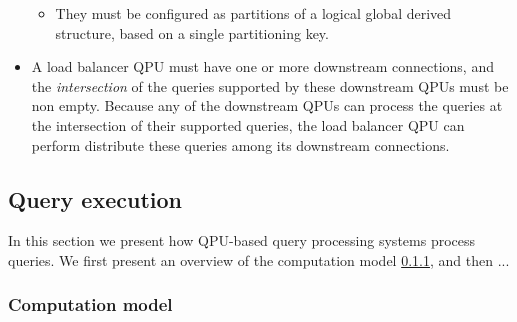 \begin{itemize}
\begin{itemize}
    \item They must be configured as partitions of a logical global derived structure, based on a single partitioning key.
  \end{itemize}

  \item A load balancer QPU must have one or more downstream connections, and the \textit{intersection} of the queries
  supported by these downstream QPUs must be non empty.
  Because any of the downstream QPUs can process the queries at the intersection of their supported queries, the load
  balancer QPU can perform distribute these queries among its downstream connections.
\end{itemize}


\subsection{Query execution}

In this section we present how QPU-based query processing systems process queries.
We first present an overview of the computation model \ref{sec:computation_model}, and then ...

\subsubsection{Computation model}
\label{sec:computation_model}




